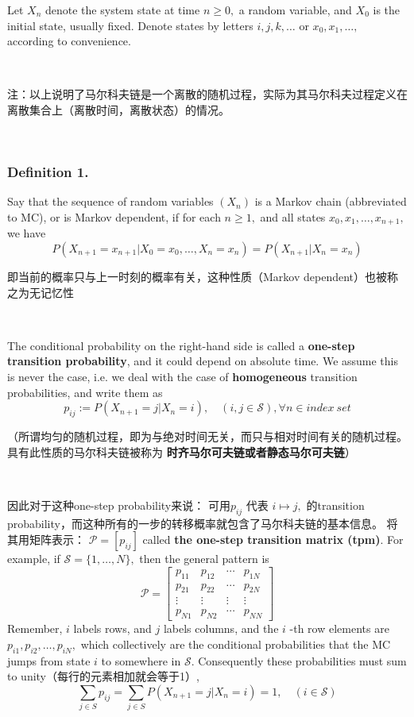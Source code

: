 \documentclass[UTF8]{ctexart}
\begin{document}
Let $X_{n}$ denote the system state at time $n \geq 0,$ a random variable, and $X_{0}$ is the initial state, usually fixed. Denote states by letters $i, j, k, \ldots$ or $x_{0}, x_{1}, \ldots,$ according to convenience.

\

注：以上说明了马尔科夫链是一个离散的随机过程，实际为其马尔科夫过程定义在离散集合上（离散时间，离散状态）的情况。

\

\subsubsection{Definition 1.} Say that the sequence of random variables $\left(X_{n}\right)$ is a Markov chain (abbreviated to MC), or is Markov dependent, if for each $n \geq 1,$ and all states $x_{0}, x_{1}, \ldots, x_{n+1},$ we have
$$
P\left(X_{n+1}=x_{n+1} | X_{0}=x_{0}, \ldots, X_{n}=x_{n}\right)=P\left(X_{n+1} | X_{n}=x_{n}\right)
$$

即当前的概率只与上一时刻的概率有关，这种性质（Markov dependent）也被称之为无记忆性

\

The conditional probability on the right-hand side is called a \textbf{one-step transition probability}, and it could depend on absolute time. We assume this is never the case, i.e. we deal with the case of \textbf{homogeneous} transition probabilities, and write them as
$$
p_{i j}:=P\left(X_{n+1}=j | X_{n}=i\right), \quad( i, j \in \mathcal{S}),\forall n \in index\ set
$$

（所谓均匀的随机过程，即为与绝对时间无关，而只与相对时间有关的随机过程。具有此性质的马尔科夫链被称为 \textbf{时齐马尔可夫链或者静态马尔可夫链}）

\

因此对于这种one-step probability来说： 可用$p_{i j}$ 代表  $i \mapsto j,$ 的transition probability，而这种所有的一步的转移概率就包含了马尔科夫链的基本信息。 将其用矩阵表示： $\mathcal{P}=\left[p_{i j}\right]$ called \textbf{ the one-step transition matrix (tpm)}. For example, if $\mathcal{S}=\{1, \ldots, N\},$ then the general pattern is
$$
\mathcal{P}=\left[\begin{array}{cccc}
p_{11} & p_{12} & \cdots & p_{1 N} \\
p_{21} & p_{22} & \cdots & p_{2 N} \\
\vdots & \vdots & \vdots & \vdots \\
p_{N 1} & p_{N 2} & \cdots & p_{N N}
\end{array}\right]
$$
Remember, $i$ labels rows, and $j$ labels columns, and the $i$ -th row elements are $p_{i 1}, p_{i 2}, \ldots, p_{i N},$ which collectively are the conditional probabilities that the MC jumps from state $i$ to somewhere in $\mathcal{S} .$ Consequently these probabilities must sum to unity（每行的元素相加就会等于1）,
$$
\sum_{j \in S} p_{i j}=\sum_{j \in S} P\left(X_{n+1}=j | X_{n}=i\right)=1, \quad(i \in \mathcal{S})
$$
\end{document}

